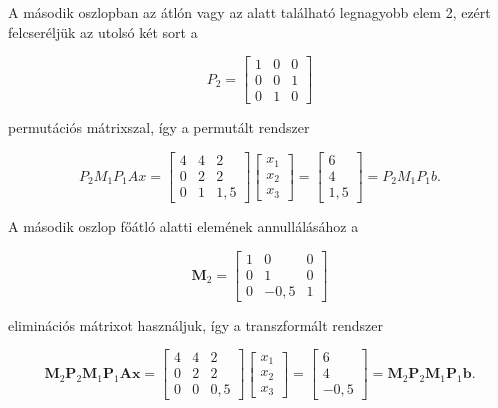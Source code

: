 \documentclass[
  magyar,
  11pt]{article}
\providecommand{\boldsymbol}[1]{\mathbf{#1}}
\begin{document}
A második oszlopban az átlón vagy az alatt található legnagyobb elem 2,
ezért felcseréljük az utolsó két sort a

\[P_2 = \begin{bmatrix} 1 & 0 & 0 \\ 0 & 0 & 1 \\ 0 & 1 & 0 \end{bmatrix}\]

permutációs mátrixszal, így a permutált rendszer

\[P_2 M_1 P_1 A x = \begin{bmatrix} 4 & 4 & 2 \\ 0 & 2 & 2 \\ 0 & 1 & 1{,}5 \end{bmatrix} \begin{bmatrix} x_1 \\ x_2 \\ x_3 \end{bmatrix} = \begin{bmatrix} 6 \\ 4 \\ 1{,}5 \end{bmatrix} = P_2 M_1 P_1 b.\]

A második oszlop főátló alatti elemének annullálásához a

\[\mathbf{M}_2 = \begin{bmatrix} 1 & 0 & 0 \\ 0 & 1 & 0 \\ 0 & -0{,}5 & 1 \end{bmatrix}\]

eliminációs mátrixot használjuk, így a transzformált rendszer

\[\boldsymbol{M}_2\boldsymbol{P}_2\boldsymbol{M}_1\boldsymbol{P}_1\boldsymbol{A}\boldsymbol{x} = \begin{bmatrix} 4 & 4 & 2 \\ 0 & 2 & 2 \\ 0 & 0 & 0{,}5 \end{bmatrix} \begin{bmatrix} x_1 \\ x_2 \\ x_3 \end{bmatrix} = \begin{bmatrix} 6 \\ 4 \\ -0{,}5 \end{bmatrix} = \boldsymbol{M}_2\boldsymbol{P}_2\boldsymbol{M}_1\boldsymbol{P}_1\boldsymbol{b}.\]
\end{document}
